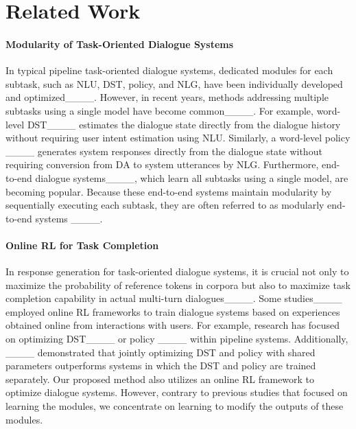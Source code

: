 \section{Related Work}
\paragraph{Modularity of Task-Oriented Dialogue Systems}
In typical pipeline task-oriented dialogue systems, dedicated modules for each subtask, such as NLU, DST, policy, and NLG, have been individually developed and optimized____. However, in recent years, methods addressing multiple subtasks using a single model have become common____. For example, word-level DST____ estimates the dialogue state directly from the dialogue history without requiring user intent estimation using NLU. Similarly, a word-level policy ____ generates system responses directly from the dialogue state without requiring conversion from DA to system utterances by NLG. Furthermore, end-to-end dialogue systems____, which learn all subtasks using a single model, are becoming popular. Because these end-to-end systems maintain modularity by sequentially executing each subtask, they are often referred to as modularly end-to-end systems ____.

\paragraph{Online RL for Task Completion}
In response generation for task-oriented dialogue systems, it is crucial not only to maximize the probability of reference tokens in corpora but also to maximize task completion capability in actual multi-turn dialogues____. Some studies____ employed online RL frameworks to train dialogue systems based on experiences obtained online from interactions with users. For example,  research has focused on optimizing DST____ or policy ____ within pipeline systems. Additionally, ____ demonstrated that jointly optimizing DST and policy with shared parameters outperforms systems in which the DST and policy are trained separately. Our proposed method also utilizes an online RL framework  to optimize dialogue systems. However, contrary to previous studies that focused on learning the modules, we concentrate on learning to modify the outputs of these modules.

